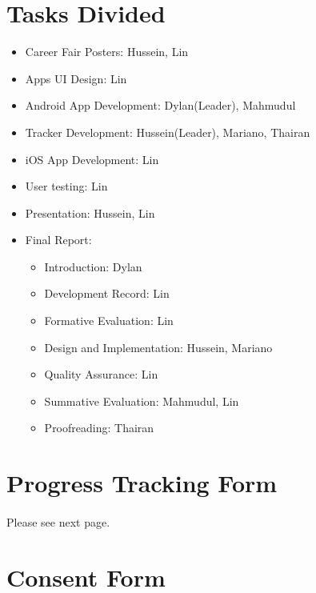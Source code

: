 \documentclass[12pt,a4paper]{article}
\begin{document}
\begin{appendices}
      \section{Tasks Divided}\label{appendix:tasks-divided}
        \begin{itemize}
          \item{Career Fair Posters}: Hussein, Lin
          \item{Apps UI Design}: Lin
          \item{Android App Development}: Dylan(Leader), Mahmudul
          \item{Tracker Development}: Hussein(Leader), Mariano, Thairan
          \item{iOS App Development}: Lin
          \item{User testing}: Lin
          \item{Presentation}: Hussein, Lin
          \item{Final Report}: 
          \begin{itemize}
            \item{Introduction}: Dylan
            \item{Development Record}: Lin
            \item{Formative Evaluation}: Lin
            \item{Design and Implementation}: Hussein, Mariano
            \item{Quality Assurance}: Lin
            \item{Summative Evaluation}: Mahmudul, Lin
            \item{Proofreading}: Thairan
          \end{itemize}
        \end{itemize}

      \section{Progress Tracking Form}\label{appendix:progress-tracking-form}
        \paragraph{} Please see next page.
        
        
      \section{Consent Form}\label{appendix:consent-form}

\end{appendices}
\end{document}
